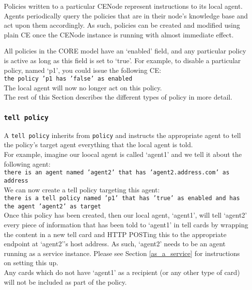 \documentclass{article}
\begin{document}
Policies written to a particular CENode represent instructions to its local agent. Agents periodically query the policies that are in their node's knowledge base and act upon them accordingly. As such, policies can be created and modified using plain CE once the CENode instance is running with almost immediate effect.

All policies in the CORE model have an `enabled' field, and any particular policy is active as long as this field is set to `true'. For example, to disable a particular policy, named `p1', you could issue the following CE:\\
\texttt{the policy 'p1 has 'false' as enabled}\\
The local agent will now no longer act on this policy.\\

The rest of this Section describes the different types of policy in more detail.

\subsubsection{\texttt{tell policy}}
A \texttt{tell policy} inherits from \texttt{policy} and instructs the appropriate agent to tell the policy's target agent everything that the local agent is told.\\

For example, imagine our loocal agent is called `agent1' and we tell it about the following agent:\\
\texttt{there is an agent named 'agent2' that has 'agent2.address.com' as address}\\
We can now create a tell policy targeting this agent:\\
\texttt{there is a tell policy named 'p1' that has 'true' as enabled and has the agent 'agent2' as target}\\

Once this policy has been created, then our local agent, `agent1', will tell `agent2' every piece of information that has been told to `agent1' in tell cards by wrapping the content in a new tell card and HTTP POSTing this to the appropriate endpoint at `agent2''s host address. As such, `agent2' needs to be an agent running as a service instance. Please see Section \ref{as_a_service} for instructions on setting this up.\\

Any cards which do not have `agent1' as a recipient (or any other type of card) will not be included as part of the policy.
\end{document}
